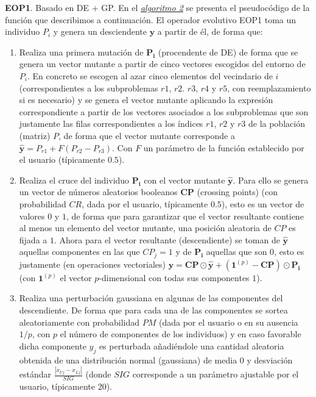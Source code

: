     \noindent\textbf{EOP1}. Basado en DE + GP. En el \hyperref[alg:2]{\textit{algoritmo 2}} se presenta el pseudocódigo de la función que describimos a continuación. El operador evolutivo EOP1 toma un individuo $P_i$ y genera un desciendente $\boldsymbol{y}$ a partir de él, de forma que:\\
    
    \begin{enumerate}
        \item Realiza una primera mutación de $\boldsymbol{P_i}$ (procendente de DE) de forma que se genera un vector mutante a partir de cinco vectores escogidos del entorno de $P_i$. En concreto se escogen al azar cinco elementos del vecindario de $i$ (correspondientes a los subproblemas $r1$, $r2$. $r3$, $r4$ y $r5$, con reemplazamiento si es necesario) y se genera el vector mutante aplicando la expresión correspondiente a partir de los vectores asociados a los subproblemas que son justamente las filas correspondientes a los índices $r1$, $r2$ y $r3$ de la población (matriz) $P$, de forma que el vector mutante corresponde a $\boldsymbol{\hat{y}} = P_{r1} + F (P_{r2} - P_{r3})$. Con $F$ un parámetro de la función establecido por el usuario (típicamente $0.5$). \\
        
        \item Realiza el cruce del individuo $\boldsymbol{P_i}$ con el vector mutante $\boldsymbol{\hat{y}}$. Para ello se genera un vector de números aleatorios booleanos $\boldsymbol{CP}$ (crossing points) (con probabilidad $CR$, dada por el usuario, típicamente $0.5$), esto es un vector de valores $0$ y $1$, de forma que para garantizar que el vector resultante contiene al menos un elemento del vector mutante, una posición aleatoria de $CP$ es fijada a $1$. Ahora para el vector resultante (descendiente) se toman  de $\boldsymbol{\hat{y}}$ aquellas componentes en las que $CP_j = 1$ y de $\boldsymbol{P_i}$ aquellas que son $0$, esto es justamente (en operaciones vectoriales) $\boldsymbol{y} = \boldsymbol{CP} \odot \boldsymbol{\hat{y}} +  (\boldsymbol{1}^{(p)} - \boldsymbol{CP}) \odot \boldsymbol{P_i}$ (con $\boldsymbol{1}^{(p)}$ el vector $p$-dimensional con todas sus componentes  $1$).\\
        
        \item Realiza una perturbación gaussiana en algunas de las componentes del descendiente. De forma que para cada una de las componentes se sortea aleatoriamente con probabilidad $PM$ (dada por el usuario o en su ausencia $1/p$, con $p$ el número de componentes de los individuos) y en caso favorable dicha componente $y_j$ es perturbada añadiéndole una cantidad aleatoria obtenida de una distribución normal (gaussiana) de media 0 y desviación estándar $\frac{|x_{Uj} - x_{Lj}|}{SIG}$ (donde $SIG$ corresponde a un parámetro ajustable por el usuario, típicamente 20). \\
        

\end{enumerate}
